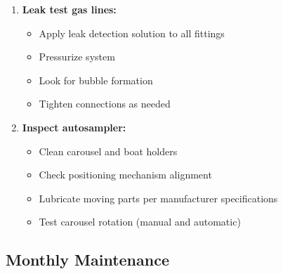\documentclass[11pt,a4paper]{article}\usepackage[]{graphicx}\usepackage[]{xcolor}
\begin{document}
\begin{enumerate}[noitemsep]
\begin{itemize}
        \item Test delivery volume accuracy (dispense onto weighing paper, weigh)
        \item Adjust volume calibration if necessary
    \end{itemize}
    \item \textbf{Leak test gas lines:}
    \begin{itemize}
        \item Apply leak detection solution to all fittings
        \item Pressurize system
        \item Look for bubble formation
        \item Tighten connections as needed
    \end{itemize}
    \item \textbf{Inspect autosampler:}
    \begin{itemize}
        \item Clean carousel and boat holders
        \item Check positioning mechanism alignment
        \item Lubricate moving parts per manufacturer specifications
        \item Test carousel rotation (manual and automatic)
    \end{itemize}
\end{enumerate}

\subsection{Monthly Maintenance}
\end{document}
